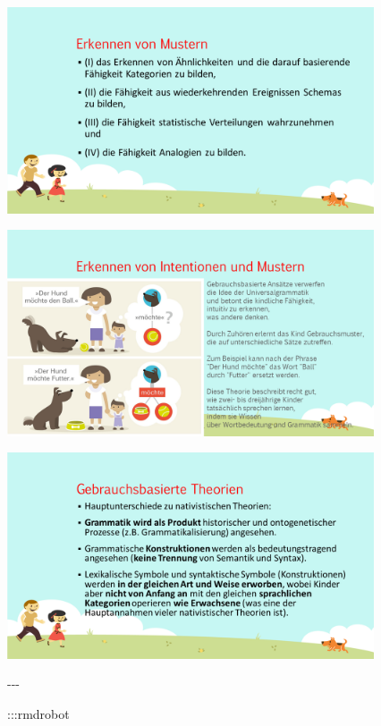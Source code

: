 \documentclass[
  letterpaper,
]{scrbook}
\begin{document}
\includegraphics[width=4.27in,height=\textheight]{./pictures/muster_intentionen/Diapozitiv7.PNG}

\includegraphics[width=4.27in,height=\textheight]{./pictures/muster_intentionen/Diapozitiv8.PNG}

\includegraphics[width=4.27in,height=\textheight]{./pictures/muster_intentionen/Diapozitiv9.PNG}

-\/-\/-

\hfill\break
:::rmdrobot
\end{document}
